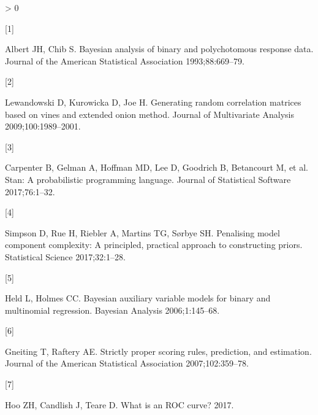 \documentclass[]{elsarticle} %
\newlength{\cslhangindent}
\newlength{\csllabelwidth}
\newenvironment{CSLReferences}[2] %
 {%
  \setlength{\parindent}{0pt}
  \ifodd #1 \everypar{\setlength{\hangindent}{\cslhangindent}}\ignorespaces\fi
  \ifnum #2 > 0
  \setlength{\parskip}{#2\baselineskip}
  \fi
 }%
 {}
\newcommand{\CSLLeftMargin}[1]{\parbox[t]{\csllabelwidth}{#1}}
\newcommand{\CSLRightInline}[1]{\parbox[t]{\linewidth - \csllabelwidth}{#1}\break}
\begin{document}
\hypertarget{refs}{}
\begin{CSLReferences}{0}{0}
\leavevmode\hypertarget{ref-albert1993bayesian}{}%
\CSLLeftMargin{{[}1{]} }
\CSLRightInline{Albert JH, Chib S. Bayesian analysis of binary and polychotomous response data. Journal of the American Statistical Association 1993;88:669--79.}

\leavevmode\hypertarget{ref-lewandowski2009generating}{}%
\CSLLeftMargin{{[}2{]} }
\CSLRightInline{Lewandowski D, Kurowicka D, Joe H. Generating random correlation matrices based on vines and extended onion method. Journal of Multivariate Analysis 2009;100:1989--2001.}

\leavevmode\hypertarget{ref-carpenter2017stan}{}%
\CSLLeftMargin{{[}3{]} }
\CSLRightInline{Carpenter B, Gelman A, Hoffman MD, Lee D, Goodrich B, Betancourt M, et al. Stan: A probabilistic programming language. Journal of Statistical Software 2017;76:1--32.}

\leavevmode\hypertarget{ref-simpson2017penalising}{}%
\CSLLeftMargin{{[}4{]} }
\CSLRightInline{Simpson D, Rue H, Riebler A, Martins TG, Sørbye SH. Penalising model component complexity: A principled, practical approach to constructing priors. Statistical Science 2017;32:1--28.}

\leavevmode\hypertarget{ref-held2006bayesian}{}%
\CSLLeftMargin{{[}5{]} }
\CSLRightInline{Held L, Holmes CC. Bayesian auxiliary variable models for binary and multinomial regression. Bayesian Analysis 2006;1:145--68.}

\leavevmode\hypertarget{ref-gneiting2007strictly}{}%
\CSLLeftMargin{{[}6{]} }
\CSLRightInline{Gneiting T, Raftery AE. Strictly proper scoring rules, prediction, and estimation. Journal of the American Statistical Association 2007;102:359--78.}

\leavevmode\hypertarget{ref-hoo2017roc}{}%
\CSLLeftMargin{{[}7{]} }
\CSLRightInline{Hoo ZH, Candlish J, Teare D. What is an ROC curve? 2017.}

\end{CSLReferences}
\end{document}
